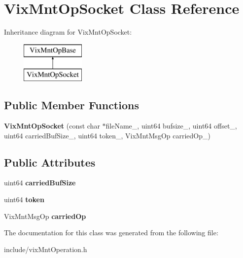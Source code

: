 \hypertarget{class_vix_mnt_op_socket}{}\section{Vix\+Mnt\+Op\+Socket Class Reference}
\label{class_vix_mnt_op_socket}
Inheritance diagram for Vix\+Mnt\+Op\+Socket\+:\begin{figure}[H]
\begin{center}
\leavevmode
\includegraphics[height=2.000000cm]{class_vix_mnt_op_socket}
\end{center}
\end{figure}
\subsection*{Public Member Functions}
\begin{DoxyCompactItemize}
\item 
\hypertarget{class_vix_mnt_op_socket_acd17d1b68b278c46cbcace73d3d80cda}{}\label{class_vix_mnt_op_socket_acd17d1b68b278c46cbcace73d3d80cda} 
{\bfseries Vix\+Mnt\+Op\+Socket} (const char $\ast$file\+Name\+\_\+, uint64 bufsize\+\_\+, uint64 offset\+\_\+, uint64 carried\+Buf\+Size\+\_\+, uint64 token\+\_\+, Vix\+Mnt\+Msg\+Op carried\+Op\+\_\+)
\end{DoxyCompactItemize}
\subsection*{Public Attributes}
\begin{DoxyCompactItemize}
\item 
\hypertarget{class_vix_mnt_op_socket_a9af0309b8cb393241c24e5044583e564}{}\label{class_vix_mnt_op_socket_a9af0309b8cb393241c24e5044583e564} 
uint64 {\bfseries carried\+Buf\+Size}
\item 
\hypertarget{class_vix_mnt_op_socket_adf59f3906bf103bf9776c29985aceb8b}{}\label{class_vix_mnt_op_socket_adf59f3906bf103bf9776c29985aceb8b} 
uint64 {\bfseries token}
\item 
\hypertarget{class_vix_mnt_op_socket_ad4bb9c2a1ccec7070a5066093dbd5b3f}{}\label{class_vix_mnt_op_socket_ad4bb9c2a1ccec7070a5066093dbd5b3f} 
Vix\+Mnt\+Msg\+Op {\bfseries carried\+Op}
\end{DoxyCompactItemize}


The documentation for this class was generated from the following file\+:\begin{DoxyCompactItemize}
\item 
include/vix\+Mnt\+Operation.\+h\end{DoxyCompactItemize}
